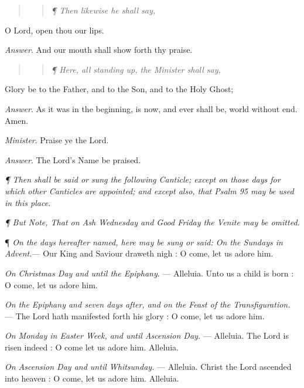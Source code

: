 \begin{quote}

\begin{quote}

\emph{¶
Then likewise he shall say,}

\end{quote}

\end{quote}

O
Lord, open thou our lips.\emph{}

\emph{Answer}. And our mouth
shall show forth thy praise.

\begin{quote}

\begin{quote}
\emph{¶
Here, all standing up, the Minister shall say,}
\end{quote}

\end{quote}

Glory be to the Father, and to the Son, and to the Holy Ghost;

\emph{Answer}. As it was in the beginning, is now,
and ever shall be, world without end. Amen.

\emph{Minister}. Praise ye the Lord.

\emph{Answer}. The Lord’s Name be praised.

\emph{¶
Then shall be said or sung the following Canticle; except on those days
for which other Canticles are appointed; and except also, that Psalm
95 may be used in this place.}

\emph{¶
But Note, That on Ash Wednesday and Good Friday the Venite may be omitted.}

\emph{}\emph{}\emph{} \emph{}

¶
\emph{On the days hereafter named, here may be sung or said: On the Sundays in Advent.}— Our King and
Saviour draweth nigh : O come, let us adore him.

\emph{On Christmas Day and until the Epiphany}. —
Alleluia. Unto us a child is born : O come, let us adore him.

\emph{On the Epiphany and seven days after, and on the Feast
of the Transfiguration.} — The Lord hath manifested forth his
glory : O come, let us adore him.

\emph{On Monday in Easter Week, and until Ascension Day.}
— Alleluia. The Lord is risen indeed : O come let us adore him.
Alleluia.

\emph{On Ascension Day and until Whitsunday.} —
Alleluia. Christ the Lord ascended into heaven : O come, let us adore
him. Alleluia.


